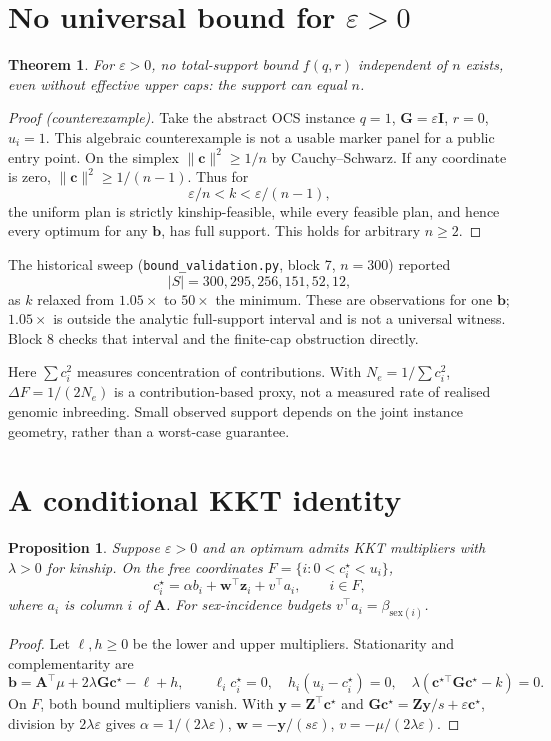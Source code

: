 \documentclass[11pt]{article}
\theoremstyle{plain}
\newtheorem{theorem}{Theorem}
\newtheorem{proposition}{Proposition}
\newcommand{\tp}{^{\top}}
\newcommand{\bc}{\mathbf{c}}
\newcommand{\bb}{\mathbf{b}}
\newcommand{\bG}{\mathbf{G}}
\newcommand{\bZ}{\mathbf{Z}}
\newcommand{\bA}{\mathbf{A}}
\newcommand{\by}{\mathbf{y}}
\newcommand{\bw}{\mathbf{w}}
\newcommand{\bze}{\mathbf{z}}
\begin{document}
\section{No universal bound for \texorpdfstring{$\varepsilon > 0$}{eps>0}}\label{sec:noridge}
\begin{theorem}\label{thm:noridge}
For $\varepsilon>0$, no total-support bound $f(q,r)$ independent of $n$ exists, even without effective upper caps: the support can equal $n$.
\end{theorem}
\begin{proof}[Proof (counterexample)]
Take the abstract OCS instance $q=1$, $\bG=\varepsilon\mathbf{I}$, $r=0$, $u_i=1$. This algebraic counterexample is not a usable marker panel for a public entry point. On the simplex $\|\bc\|^2\ge1/n$ by Cauchy--Schwarz. If any coordinate is zero, $\|\bc\|^2\ge1/(n-1)$. Thus for
\[
 \varepsilon/n<k<\varepsilon/(n-1),
\]
the uniform plan is strictly kinship-feasible, while every feasible plan, and hence every optimum for any $\bb$, has full support. This holds for arbitrary $n\ge2$.
\end{proof}

The historical sweep (\texttt{bound\_validation.py}, block 7, $n=300$) reported
\[|S|=300,295,256,151,52,12,\]
as $k$ relaxed from $1.05\times$ to $50\times$ the minimum. These are observations for one $\bb$; $1.05\times$ is outside the analytic full-support interval and is not a universal witness. Block 8 checks that interval and the finite-cap obstruction directly.

Here $\sum c_i^2$ measures concentration of contributions. With $N_e=1/\sum c_i^2$, $\Delta F=1/(2N_e)$ is a contribution-based proxy, not a measured rate of realised genomic inbreeding. Small observed support depends on the joint instance geometry, rather than a worst-case guarantee.

\section{A conditional KKT identity}\label{sec:kkt}
\begin{proposition}\label{prop:kkt}
Suppose $\varepsilon>0$ and an optimum admits KKT multipliers with $\lambda>0$ for kinship. On the free coordinates $F=\{i:0<c_i^\star<u_i\}$,
\[
 c_i^\star=\alpha b_i+\bw\tp\bze_i+v\tp a_i,\qquad i\in F,
\]
where $a_i$ is column $i$ of $\bA$. For sex-incidence budgets $v\tp a_i=\beta_{\mathrm{sex}(i)}$.
\end{proposition}
\begin{proof}
Let $\ell,h\ge0$ be the lower and upper multipliers. Stationarity and complementarity are
\[
 \bb=\bA\tp\mu+2\lambda\bG\bc^\star-\ell+h,\qquad
 \ell_i c_i^\star=0,\quad h_i(u_i-c_i^\star)=0,\quad
 \lambda(\bc^{\star\top}\bG\bc^\star-k)=0.
\]
On $F$, both bound multipliers vanish. With $\by=\bZ\tp\bc^\star$ and $\bG\bc^\star=\bZ\by/s+\varepsilon\bc^\star$, division by $2\lambda\varepsilon$ gives $\alpha=1/(2\lambda\varepsilon)$, $\bw=-\by/(s\varepsilon)$, $v=-\mu/(2\lambda\varepsilon)$.
\end{proof}
\end{document}
